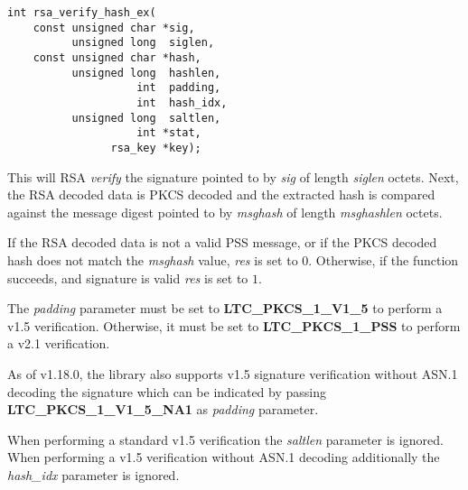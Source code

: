 \documentclass[synpaper]{book}
\begin{document}
\begin{verbatim}
int rsa_verify_hash_ex(
    const unsigned char *sig,
          unsigned long  siglen,
    const unsigned char *hash,
          unsigned long  hashlen,
                    int  padding,
                    int  hash_idx,
          unsigned long  saltlen,
                    int *stat,
                rsa_key *key);
\end{verbatim}

This will RSA \textit{verify} the signature pointed to by \textit{sig} of length \textit{siglen} octets.  Next, the RSA decoded data is PKCS decoded
and the extracted hash is compared against the message digest pointed to by \textit{msghash} of length \textit{msghashlen} octets.

If the RSA decoded data is not a valid PSS message, or if the PKCS decoded hash does not match the \textit{msghash}
value, \textit{res} is set to $0$.  Otherwise, if the function succeeds, and signature is valid \textit{res} is set to $1$.

The \textit{padding} parameter must be set to \textbf{LTC\_PKCS\_1\_V1\_5} to perform a v1.5 verification.  Otherwise, it must be set to
\textbf{LTC\_PKCS\_1\_PSS} to perform a v2.1 verification.

As of v1.18.0, the library also supports v1.5 signature verification without ASN.1 decoding the signature which can be indicated by passing
\textbf{LTC\_PKCS\_1\_V1\_5\_NA1} as \textit{padding} parameter.

When performing a standard v1.5 verification the \textit{saltlen} parameter is ignored.
When performing a v1.5 verification without ASN.1 decoding additionally the \textit{hash\_idx} parameter is ignored.
\end{document}
